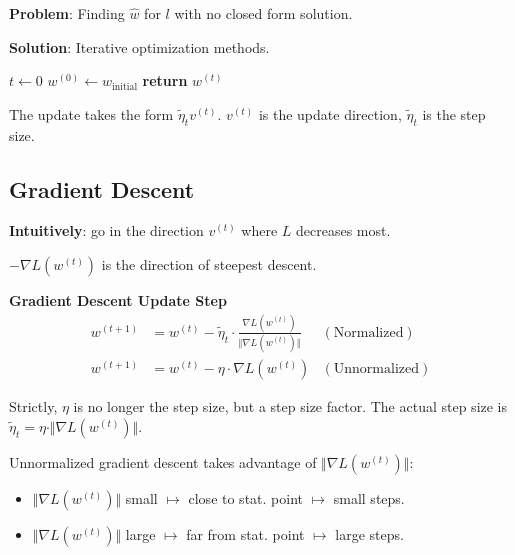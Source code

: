 \textbf{Problem}: Finding $\hat{w}$ for $l$ with no closed form solution.\\

\textbf{Solution}: Iterative optimization methods.

\begin{algorithm}
    \caption{Iterative Optimization}
    $t \gets 0$ \;
    $w^{(0)} \gets w_\text{initial}$ \;
    \textbf{return} $w^{(t)}$
\end{algorithm}

{\footnotesize
    \notation The update takes the form $\tilde{\eta}_t v^{(t)}$. $v^{(t)}$ is the update direction, $\tilde{\eta}_t$ is the step size.
}

\subsection{Gradient Descent}

\textbf{Intuitively}: go in the direction $v^{(t)}$ where $L$ decreases most.

\lemma $-\nabla L(w^{(t)})$ is the direction of steepest descent.\\

 \textbf{Gradient Descent Update Step}
\begin{align*}
        w^{(t+1)} &= w^{(t)} - \tilde{\eta}_t\cdot \frac{\nabla L(w^{(t)})}{\Vert \nabla L(w^{(t)}) \Vert}   & (\text{Normalized}) \\
        w^{(t+1)} &= w^{(t)} - \eta\cdot \nabla L(w^{(t)})                                         & (\text{Unnormalized})
\end{align*}

{\footnotesize
    \remark Strictly, $\eta$ is no longer the step size, but a step size factor. The actual step size is $\tilde{\eta}_t = \eta \cdot \Vert \nabla L(w^{(t)}) \Vert$.
}

Unnormalized gradient descent takes advantage of $\Vert \nabla L(w^{(t)}) \Vert$:
{\small
    \begin{itemize}
        \item $\Vert \nabla L(w^{(t)}) \Vert$ small $\mapsto$ close to stat. point $\mapsto$ small steps.
        \item $\Vert \nabla L(w^{(t)}) \Vert$ large $\mapsto$ far from stat. point $\mapsto$ large steps.  
    \end{itemize}
}


